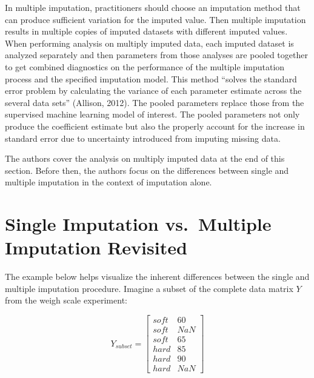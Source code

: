 \documentclass[12pt,oneside]{chicagocapstone}
\begin{document}
In multiple imputation, practitioners should choose an imputation method
that can produce sufficient variation for the imputed value. Then
multiple imputation results in multiple copies of imputed datasets with
different imputed values. When performing analysis on multiply imputed
data, each imputed dataset is analyzed separately and then parameters
from those analyses are pooled together to get combined diagnostics on
the performance of the multiple imputation process and the specified
imputation model. This method ``solves the standard error problem by
calculating the variance of each parameter estimate across the several
data sets'' (Allison, 2012). The pooled parameters replace those from
the supervised machine learning model of interest. The pooled parameters
not only produce the coefficient estimate but also the properly account
for the increase in standard error due to uncertainty introduced from
imputing missing data.

The authors cover the analysis on multiply imputed data at the end of
this section. Before then, the authors focus on the differences between
single and multiple imputation in the context of imputation alone.

\section*{Single Imputation vs.~Multiple Imputation
Revisited}\label{background-example}

The example below helps visualize the inherent differences between the
single and multiple imputation procedure. Imagine a subset of the
complete data matrix \(Y\) from the weigh scale experiment:

\[Y_{subset}=\begin{bmatrix}soft & 60 \\ soft & NaN \\ soft & 65 \\ hard & 85 \\ hard & 90 \\ hard & NaN \end{bmatrix}\]
\end{document}
